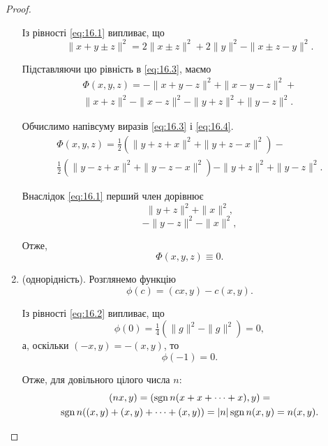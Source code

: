 \begin{proof}
\begin{enumerate}
Із рівності \eqref{eq:16.1} випливає, що
\begin{equation*}
    \|x + y \pm z\|^2 = 2 \|x \pm z\|^2 + 2 \|y\|^2 - \|x \pm z - y\|^2.
\end{equation*}

Підставляючи цю рівність в \eqref{eq:16.3}, маємо
\begin{multline}
    \label{eq:16.4}
    \Phi(x, y, z) = -\|x + y - z\|^2 + \|x - y - z\|^2 + \\
    \|x + z\|^2 - \|x - z\|^2 - \|y + z\|^2 + \|y - z\|^2.
\end{multline}

Обчислимо напівсуму виразів \eqref{eq:16.3} і \eqref{eq:16.4}.
\begin{multline*}
    \Phi(x, y, z) = \tfrac{1}{2} (\|y + z + x\|^2 + \|y + z - x\|^2) - \\
    \tfrac{1}{2} (\|y - z + x\|^2 + \|y - z - x\|^2) - \|y + z\|^2 + \|y - z\|^2.
\end{multline*}

Внаслідок \eqref{eq:16.1} перший член дорівнює
\begin{equation*}
    \|y + z\|^2 + \|x\|^2,
\end{equation*}
\begin{equation*}
    -\|y - z\|^2 - \|x\|^2,
\end{equation*}

Отже,
\begin{equation*}
    \Phi(x, y, z) \equiv 0.
\end{equation*}

\item (однорідність). Розглянемо функцію
\begin{equation*}
    \phi(c) = (c x, y) - c (x, y).
\end{equation*}

Із рівності \eqref{eq:16.2} випливає, що
\begin{equation*}
    \phi(0) = \tfrac{1}{4} (\|g\|^2 - \|g\|^2) = 0,
\end{equation*}
а, оскільки $(-x, y) = -(x, y)$, то
\begin{equation*}
    \phi(-1) = 0.
\end{equation*}

Отже, для довільного цілого числа $n$:
\begin{multline*}
    (n x, y) = (\operatorname{sgn} n (x + x + \dots + x), y) = \\
    \operatorname{sgn} n ((x, y) + (x, y) + \dots + (x, y)) =
    |n| \operatorname{sgn} n (x, y) = n (x, y).
\end{multline*}


\end{enumerate}
\end{proof}

